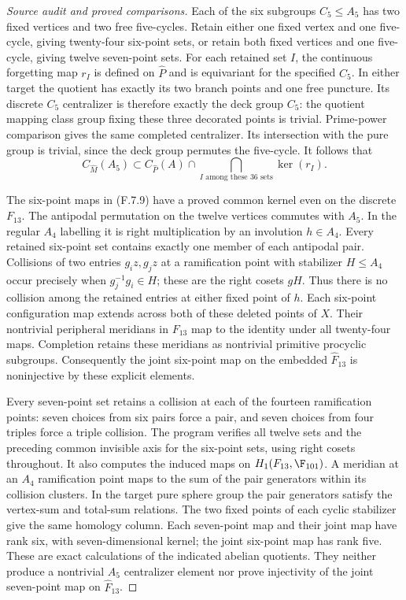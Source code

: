 \begin{proof}[Source audit and proved comparisons]
Each of the six subgroups $C_5\leq A_5$ has two fixed vertices
and two free five-cycles. Retain either one fixed vertex and
one five-cycle, giving twenty-four six-point sets, or retain
both fixed vertices and one five-cycle, giving twelve
seven-point sets. For each retained set $I$, the continuous
forgetting map $r_I$ is defined on $\widehat P$ and is equivariant
for the specified $C_5$. In either target the quotient has
exactly its two branch points and one free puncture. Its
discrete $C_5$ centralizer is therefore exactly the deck group
$C_5$: the quotient mapping class group fixing these three
decorated points is trivial. Prime-power comparison gives the
same completed centralizer. Its intersection with the pure
group is trivial, since the deck group permutes the five-cycle.
It follows that
\[
 C_{\widehat M}(A_5)\subset
 C_{\widehat P}(A)\cap
       \bigcap_{I\text{ among these }36\text{ sets}}\ker(r_I).
                                                               \tag{F.7.9}
\]

The six-point maps in (F.7.9) have a proved common kernel even
on the discrete $F_{13}$. The antipodal permutation on the
twelve vertices commutes with $A_5$. In the regular $A_4$
labelling it is right multiplication by an involution $h\in A_4$.
Every retained six-point set contains exactly one member of
each antipodal pair. Collisions of two entries $g_i z,g_j z$
at a ramification point with stabilizer $H\leq A_4$ occur
precisely when $g_j^{-1}g_i\in H$; these are the right cosets
$gH$. Thus there is no collision among the retained entries
at either fixed point of $h$. Each six-point configuration map
extends across both of these deleted points of $X$. Their
nontrivial peripheral meridians in $F_{13}$ map to the identity
under all twenty-four maps. Completion retains these meridians
as nontrivial primitive procyclic subgroups. Consequently the
joint six-point map on the embedded $\widehat F_{13}$ is
noninjective by these explicit elements.

Every seven-point set retains a collision at each of the
fourteen ramification points: seven choices from six pairs
force a pair, and seven choices from four triples force a
triple collision. The program verifies all twelve sets and
the preceding common invisible axis for the six-point sets,
using right cosets throughout. It also computes the induced
maps on $H_1(F_{13},\F_{101})$. A meridian at an $A_4$
ramification point maps to the sum of the pair generators
within its collision clusters. In the target pure sphere
group the pair generators satisfy the vertex-sum and total-sum
relations. The two fixed points of each cyclic stabilizer give
the same homology column. Each seven-point map and their joint
map have rank six, with seven-dimensional kernel; the joint
six-point map has rank five. These are exact calculations of
the indicated abelian quotients. They neither produce a
nontrivial $A_5$ centralizer element nor prove injectivity of
the joint seven-point map on $\widehat F_{13}$.


\end{proof}

